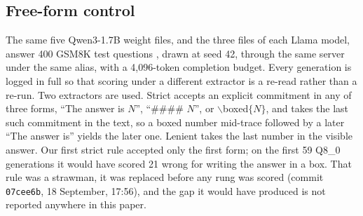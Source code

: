 \documentclass[12pt,letterpaper]{article}
\newcommand{\qm}{Qwen3-1.7B}
\begin{document}
\subsection{Free-form control}
\label{sec:freeform-method}
The same five \qm{} weight files, and the three files of each Llama model, answer 400 GSM8K test questions \citep{gsm8k2021}, drawn at seed 42, through the same server under the same alias, with a 4{,}096-token completion budget. Every generation is logged in full so that scoring under a different extractor is a re-read rather than a re-run. Two extractors are used. Strict accepts an explicit commitment in any of three forms, ``The answer is $N$'', ``\#\#\#\# $N$'', or $\backslash$boxed$\{N\}$, and takes the last such commitment in the text, so a boxed number mid-trace followed by a later ``The answer is'' yields the later one. Lenient takes the last number in the visible answer. Our first strict rule accepted only the first form; on the first 59 Q8\_0 generations it would have scored 21 wrong for writing the answer in a box. That rule was a strawman, it was replaced before any rung was scored (commit \texttt{07cee6b}, 18 September, 17:56), and the gap it would have produced is not reported anywhere in this paper.
\end{document}
